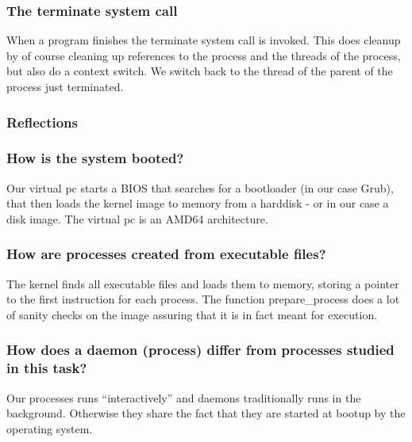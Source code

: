 \subsubsection*{The terminate system call}
When a program finishes the terminate system call is invoked. This does cleanup by of course cleaning up references to the process 
and the threads of the process, but also do a context switch. We switch back to the thread of the parent of the process just terminated.

\subsubsection{Reflections}

\subsubsection*{How is the system booted?}
Our virtual pc starts a BIOS that searches for a bootloader (in our case Grub), that then loads the kernel image to memory from a harddisk - or in our case a disk image. The virtual pc is an AMD64 architecture.

\subsubsection*{How are processes created from executable files?}
The kernel finds all executable files and loads them to memory, storing a pointer to the first instruction for each process. The function prepare\_process does a lot of sanity checks on the image assuring that it is in fact meant for execution.

\subsubsection*{How does a daemon (process) differ from processes studied in this task?}
Our processes runs ``interactively'' and daemons traditionally runs in the background. Otherwise they share the fact that they are started at bootup by the operating system.
